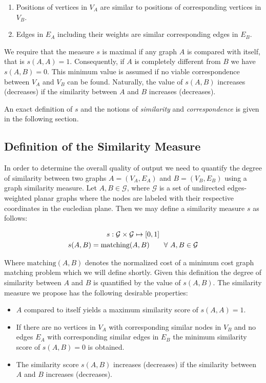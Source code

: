 		\begin{enumerate}
		\item Positions of vertices in $V_A$ are similar to positions of corresponding vertices in $V_B$.  
		\item Edges in $E_A$ including their weights are similar corresponding edges in $E_B$. 
		\end{enumerate}

		We require that the measure $s$ is maximal if any graph $A$ is compared with itself, that is $s(A,A) = 1$. Consequently, if $A$ is completely different from $B$ we have $s(A,B) = 0$. This minimum value is assumed if no viable correspondence between $V_A$ and $V_B$ can be found. Naturally, the value of $s(A,B)$ increases (decreases) if the similarity between $A$ and $B$ increases (decreases).

		An exact definition of $s$ and the notions of \emph{similarity} and \emph{correspondence} is given in the following section.

	\subsection{Definition of the Similarity Measure}

		In order to determine the overall quality of \NEFIs output we need to quantify the degree of similarity between two graphs $A = (V_A, E_A)$ and $B = (V_B, E_B)$ using a graph similarity measure. Let $A, B \in \mathcal{G}$, where $\mathcal{G}$ is a set of undirected edges-weighted planar graphs where the nodes are labeled with their respective coordinates in the eucledian plane. Then we may define a similarity measure $s$ as follows:
		
		\begin{gather}
		s : \mathcal{G} \times \mathcal{G} \mapsto [0,1] \notag \\
		s(A,B) = \text{matching}(A,B) \quad \quad \forall \ A, B \in \mathcal{G}
		\end{gather}

		Where $\text{matching}(A,B)$ denotes the normalized cost of a minimum cost graph matching problem which we will define shortly. Given this definition the degree of similarity between $A$ and $B$ is quantified by the value of $s(A,B)$. The similarity measure we propose has the following desirable properties:


		\begin{itemize}
			\item $A$ compared to itself yields a maximum similarity score of $s(A,A) = 1$.
			\item If there are no vertices in $V_A$ with corresponding similar nodes in $V_B$ and no edges $E_A$ with corresponding similar edges in $E_B$ the minimum similarity score of $s(A,B) = 0$ is obtained.
			\item The similarity score $s(A,B)$ increases (decreases) if the similarity between $A$ and $B$ increases (decreases).
		\end{itemize}

